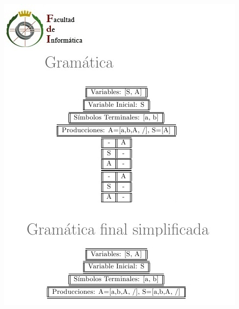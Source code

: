 \documentclass[12pt,a4paper,spanish]{book}
\begin{document}
\begin{center}
\includegraphics[scale=0.7]{late3.jpg}
\end{center}

\newpage
\end{document}
